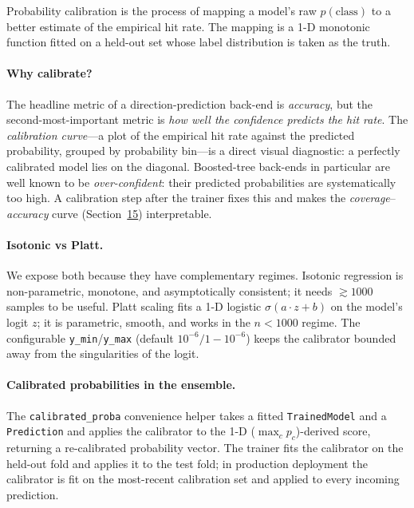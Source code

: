 \documentclass[11pt,a4paper]{article}
\begin{document}
Probability calibration is the process of mapping a model's
raw $p(\text{class})$ to a better estimate of the empirical
hit rate. The mapping is a 1-D monotonic function fitted on a
held-out set whose label distribution is taken as the truth.

\paragraph{Why calibrate?}
The headline metric of a direction-prediction back-end is
\emph{accuracy}, but the second-most-important metric is
\emph{how well the confidence predicts the hit rate}. The
\emph{calibration curve}---a plot of the empirical hit rate
against the predicted probability, grouped by probability
bin---is a direct visual diagnostic: a perfectly calibrated
model lies on the diagonal. Boosted-tree back-ends in
particular are well known to be \emph{over-confident}: their
predicted probabilities are systematically too high. A
calibration step after the trainer fixes this and makes the
\emph{coverage}--\emph{accuracy} curve (Section~\hyperref[sec:results]{15})
interpretable.

\paragraph{Isotonic vs Platt.}
We expose both because they have complementary regimes.
Isotonic regression is non-parametric, monotone, and
asymptotically consistent; it needs $\gtrsim 1000$ samples to
be useful. Platt scaling fits a 1-D logistic
$\sigma(a\cdot z+b)$ on the model's logit $z$; it is
parametric, smooth, and works in the $n<1000$ regime. The
configurable \texttt{y\_min}/\texttt{y\_max} (default
$10^{-6}/1-10^{-6}$) keeps the calibrator bounded away from
the singularities of the logit.

\paragraph{Calibrated probabilities in the ensemble.}
The \texttt{calibrated\_proba} convenience helper takes a
fitted \texttt{TrainedModel} and a \texttt{Prediction} and
applies the calibrator to the 1-D
(\(\max_c p_c\))-derived score, returning a re-calibrated
probability vector. The trainer fits the calibrator on the
held-out fold and applies it to the test fold; in production
deployment the calibrator is fit on the most-recent
calibration set and applied to every incoming prediction.

\end{document}
